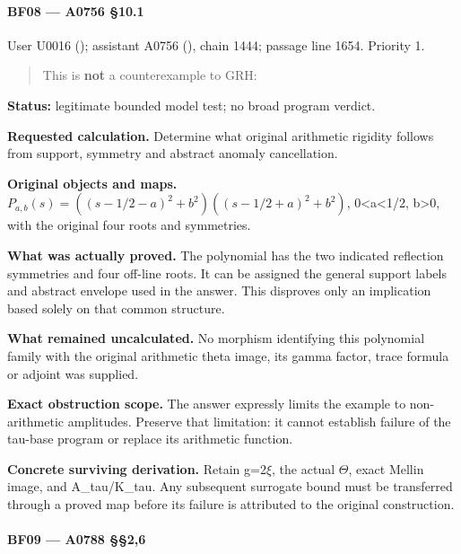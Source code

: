 \paragraph{BF08 --- A0756 §10.1}\label{bf08-a0756-10.1}

User U0016 (\protect{});
assistant A0756 (\protect{}),
chain 1444; passage line 1654. Priority 1.

\begin{quote}
This is \textbf{not} a counterexample to GRH:
\end{quote}

\textbf{Status:} legitimate bounded model test; no broad program
verdict.

\textbf{Requested calculation.} Determine what original arithmetic
rigidity follows from support, symmetry and abstract anomaly
cancellation.

\textbf{Original objects and maps.}
\(P_{a,b}(s)=((s-1/2-a)^2+b^2)((s-1/2+a)^2+b^2)\),
0\textless a\textless1/2, b\textgreater0, with the original four roots
and symmetries.

\textbf{What was actually proved.} The polynomial has the two indicated
reflection symmetries and four off-line roots. It can be assigned the
general support labels and abstract envelope used in the answer. This
disproves only an implication based solely on that common structure.

\textbf{What remained uncalculated.} No morphism identifying this
polynomial family with the original arithmetic theta image, its gamma
factor, trace formula or adjoint was supplied.

\textbf{Exact obstruction scope.} The answer expressly limits the
example to non-arithmetic amplitudes. Preserve that limitation: it
cannot establish failure of the tau-base program or replace its
arithmetic function.

\textbf{Concrete surviving derivation.} Retain
g=2\allowbreak{}\ensuremath{ξ}\allowbreak{}, the actual
\allowbreak{}\ensuremath{Θ}\allowbreak{}, exact Mellin image, and
A\_tau/K\_tau. Any subsequent surrogate bound must be transferred
through a proved map before its failure is attributed to the original
construction.

\paragraph{BF09 --- A0788 §§2,6}\label{bf09-a0788-26}

